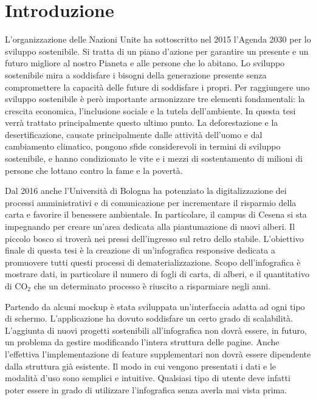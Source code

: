 \chapter*{Introduzione}
\noindent L'organizzazione delle Nazioni Unite ha sottoscritto nel 2015 l'Agenda 2030 per lo sviluppo sostenibile. Si tratta di un piano d'azione per garantire un presente e un futuro migliore al nostro Pianeta e alle persone che lo abitano.\newline
Lo sviluppo sostenibile mira a soddisfare i
bisogni della generazione presente senza compromettere la capacità delle future di soddisfare i propri.\newline
Per raggiungere uno sviluppo sostenibile è però importante armonizzare tre
elementi fondamentali: la crescita economica, l’inclusione sociale e la tutela dell’ambiente.
In questa tesi verrà trattato principalmente questo ultimo punto.
La deforestazione e la desertificazione, causate principalmente dalle attività dell’uomo e dal cambiamento climatico, pongono sfide considerevoli in termini di sviluppo sostenibile, e hanno condizionato le vite e i mezzi di sostentamento di milioni di persone che lottano contro la fame e la povertà.

\noindent Dal 2016 anche l’Università di Bologna ha potenziato la digitalizzazione dei processi amministrativi e di comunicazione per incrementare il risparmio della carta e favorire il benessere ambientale.\newline
In particolare, il campus di Cesena si sta impegnando per creare un'area dedicata alla piantumazione di nuovi alberi. Il piccolo bosco si troverà nei pressi dell'ingresso sul retro dello stabile.\newline
L'obiettivo finale di questa tesi è la creazione di un'infografica responsive dedicata a promuovere tutti questi processi di dematerializzazione.\newline
Scopo dell'infografica è mostrare dati, in particolare il numero di fogli di carta, di alberi, e il quantitativo di CO$_2$ che un determinato processo è riuscito a risparmiare negli anni.

\noindent Partendo da alcuni mockup è stata sviluppata un'interfaccia adatta ad ogni tipo di schermo.\newline
L'applicazione ha dovuto soddisfare un certo grado di scalabilità.
L'aggiunta di nuovi progetti sostenibili all'infografica non dovrà essere, in futuro, un problema da gestire modificando l'intera struttura delle pagine.
Anche l'effettiva l'implementazione di feature supplementari non dovrà essere dipendente dalla struttura già esistente.\newline 
Il modo in cui vengono presentati i dati e le modalità d'uso sono semplici e intuitive. Qualsiasi tipo di utente deve infatti poter essere in grado di utilizzare l'infografica senza averla mai vista prima.\newline

